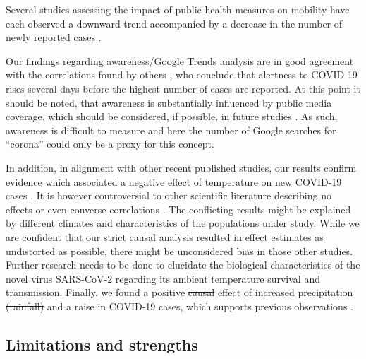 \documentclass[10pt,letterpaper]{article}
\providecommand{\DIFdeltex}[1]{{\protect\color{red}\sout{#1}}}                      %
\providecommand{\DIFdelbegin}{} %
\providecommand{\DIFdelend}{} %
\providecommand{\DIFdel}[1]{\texorpdfstring{\DIFdeltex{#1}}{}} %
\newcommand{\DIFscaledelfig}{0.5}
\newlength{\DIFdelgraphicswidth} %
\newlength{\DIFdelgraphicsheight} %
\newcommand{\DIFdelincludegraphics}[2][]{%
\sbox{\DIFdelgraphicsbox}{\DIFOincludegraphics[#1]{#2}}%
\settoboxwidth{\DIFdelgraphicswidth}{\DIFdelgraphicsbox} %
\settoboxtotalheight{\DIFdelgraphicsheight}{\DIFdelgraphicsbox} %
\scalebox{\DIFscaledelfig}{%
\parbox[b]{\DIFdelgraphicswidth}{\usebox{\DIFdelgraphicsbox}\\[-\baselineskip] \rule{\DIFdelgraphicswidth}{0em}}\llap{\resizebox{\DIFdelgraphicswidth}{\DIFdelgraphicsheight}{%
\setlength{\unitlength}{\DIFdelgraphicswidth}%
\begin{picture}(1,1)%
\thicklines\linethickness{2pt} %
{\color[rgb]{1,0,0}\put(0,0){\framebox(1,1){}}}%
{\color[rgb]{1,0,0}\put(0,0){\line( 1,1){1}}}%
{\color[rgb]{1,0,0}\put(0,1){\line(1,-1){1}}}%
\end{picture}%
}\hspace*{3pt}}} %
} %
\DeclareRobustCommand{\DIFdelbegin}{\DIFOdelbegin \let\includegraphics\DIFdelincludegraphics} %
\DeclareRobustCommand{\DIFdelend}{\DIFOaddend \let\includegraphics\DIFOincludegraphics} %
\begin{document}
Several studies assessing the impact of public health measures on mobility have each observed a downward trend accompanied by a decrease in the number of newly reported cases \cite{chang_modeling_2020, cowling2020impact, fowler_effect_2020, kraemer_effect_2020, lai_effect_2020, linka_outbreak_2020}.

Our findings regarding awareness/Google Trends analysis are in good agreement with the correlations found by others \cite{effenberger_association_2020,higgins_correlations_2020,yuan_trends_2020}, who conclude that alertness to COVID-19 rises several days before the highest number of cases are reported. At this point it should be noted, that awareness is substantially influenced by public media coverage, which should be considered, if possible, in future studies \cite{higgins_correlations_2020}. As such, awareness is difficult to measure and here the number of Google searches for ``corona'' could only be a proxy for this concept.

In addition, in alignment with other recent published studies, our results confirm evidence which associated a negative effect of temperature on new COVID-19 cases \cite{bannister-tyrrell_preliminary_2020, demongeot_temperature_2020, liu_impact_2020, qi_covid-19_2020, shi_impact_2020, sobral_association_2020, tosepu_correlation_2020, Wang2020temperature, wu_effects_2020}. It is however controversial to other scientific literature describing no effects \cite{briz-redon_spatio-temporal_2020, iqbal_nexus_2020, jahangiri_sensitivity_2020, juni_impact_2020, yao_no_2020} or even converse correlations \cite{auler_evidence_2020, xie_association_2020}. The conflicting results might be explained by different climates and characteristics of the populations under study. While we are confident that our strict causal analysis resulted in effect estimates as undistorted as possible, there might be unconsidered bias in those other studies. Further research needs to be done to elucidate the biological characteristics of the novel virus SARS-CoV-2 regarding its ambient temperature survival and transmission. Finally, we found a positive \DIFdelbegin \DIFdel{causal }\DIFdelend effect of increased precipitation \DIFdelbegin \DIFdel{(rainfall) }\DIFdelend and a raise in COVID-19 cases, which supports previous observations \cite{sobral_association_2020}.

\subsection*{Limitations and strengths}\label{limitations-and-strengths}
\end{document}
